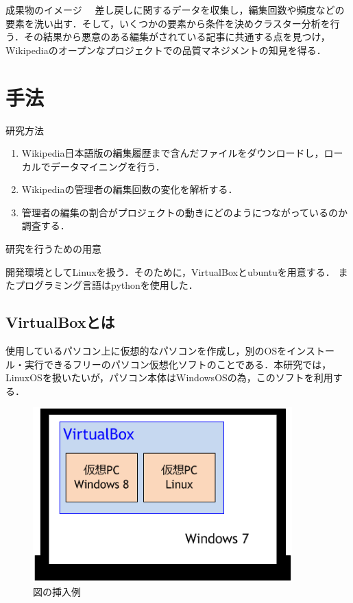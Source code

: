 成果物のイメージ
　差し戻しに関するデータを収集し，編集回数や頻度などの要素を洗い出す．そして，いくつかの要素から条件を決めクラスター分析を行う．その結果から悪意のある編集がされている記事に共通する点を見つけ，Wikipediaのオープンなプロジェクトでの品質マネジメントの知見を得る．




\chapter{手法}

研究方法

\begin{enumerate}
 \item Wikipedia日本語版の編集履歴まで含んだファイルをダウンロードし，ローカルでデータマイニングを行う．
 \item Wikipediaの管理者の編集回数の変化を解析する．
 \item 管理者の編集の割合がプロジェクトの動きにどのようにつながっているのか調査する．
\end{enumerate}

研究を行うための用意

開発環境としてLinuxを扱う．そのために，VirtualBoxとubuntuを用意する． またプログラミング言語はpythonを使用した．



\section{VirtualBoxとは}

使用しているパソコン上に仮想的なパソコンを作成し，別のOSをインストール・実行できるフリーのパソコン仮想化ソフトのことである．本研究では，LinuxOSを扱いたいが，パソコン本体はWindowsOSの為，このソフトを利用する．


\begin{figure}[H]
\centering
\includegraphics[width=10cm]{sample10.png}
\caption{図の挿入例}\label{サンプル図}
\end{figure}






